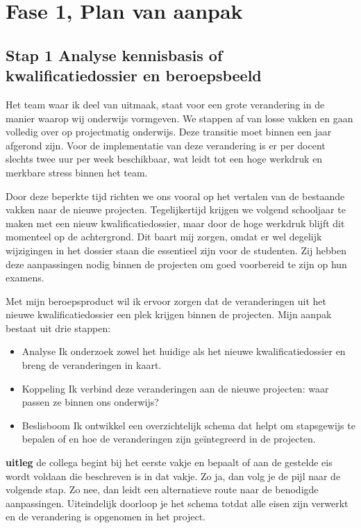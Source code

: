 \chapter{Fase 1, Plan van aanpak}
\section{Stap 1 Analyse kennisbasis of kwalificatiedossier en beroepsbeeld}

Het team waar ik deel van uitmaak, staat voor een grote verandering in de manier waarop wij onderwijs vormgeven. We stappen af van losse vakken en gaan volledig over op projectmatig onderwijs. Deze transitie moet binnen een jaar afgerond zijn. Voor de implementatie van deze verandering is er per docent slechts twee uur per week beschikbaar, wat leidt tot een hoge werkdruk en merkbare stress binnen het team.

Door deze beperkte tijd richten we ons vooral op het vertalen van de bestaande vakken naar de nieuwe projecten. Tegelijkertijd krijgen we volgend schooljaar te maken met een nieuw kwalificatiedossier, maar door de hoge werkdruk blijft dit momenteel op de achtergrond. Dit baart mij zorgen, omdat er wel degelijk wijzigingen in het dossier staan die essentieel zijn voor de studenten. Zij hebben deze aanpassingen nodig binnen de projecten om goed voorbereid te zijn op hun examens.

Met mijn beroepsproduct wil ik ervoor zorgen dat de veranderingen uit het nieuwe kwalificatiedossier een plek krijgen binnen de projecten. Mijn aanpak bestaat uit drie stappen:
\begin{itemize}
    \item Analyse Ik onderzoek zowel het huidige als het nieuwe kwalificatiedossier en breng de veranderingen in kaart.
    \item Koppeling Ik verbind deze veranderingen aan de nieuwe projecten: waar passen ze binnen ons onderwijs?
    \item Beslisboom Ik ontwikkel een overzichtelijk schema dat helpt om stapsgewijs te bepalen of en hoe de veranderingen zijn geïntegreerd in de projecten.
\end{itemize}


\textbf{uitleg}
de collega begint bij het eerste vakje en bepaalt of aan de gestelde eis wordt voldaan die beschreven is in dat vakje. Zo ja, dan volg je de pijl naar de volgende stap. Zo nee, dan leidt een alternatieve route naar de benodigde aanpassingen. Uiteindelijk doorloop je het schema totdat alle eisen zijn verwerkt en de verandering is opgenomen in het project.

